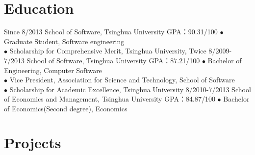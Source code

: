 \documentclass[]{friggeri-cv}
\begin{document}
\section{Education}

\begin{entrylist}
  \entry
    {Since 8/2013}
    {School of Software, Tsinghua University}
    {GPA：90.31/100}
    {$\bullet$ Graduate Student, Software engineering \\
    $\bullet$ Scholarship for Comprehensive Merit, Tsinghua University, Twice
    }
  \entry
    {8/2009-7/2013}
    {School of Software, Tsinghua University}
    {GPA：87.21/100}
    {$\bullet$ Bachelor of Engineering, Computer Software \\
    $\bullet$ Vice President, Association for Science and Technology, School of Software\\
    $\bullet$ Scholarship for Academic Excellence, Tsinghua University
    }
  \entry
    {8/2010-7/2013}
    {School of Economics and Management, Tsinghua University}
    {GPA：84.87/100}
    {$\bullet$ Bachelor of Economics(Second degree), Economics}
\end{entrylist}

\section{Projects}
\end{document}
